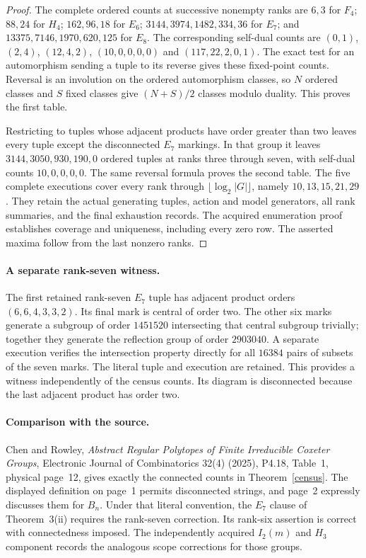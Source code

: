 \documentclass[11pt,a4paper]{article}
\begin{document}
\begin{proof}
The complete ordered counts at successive nonempty ranks are
$6,3$ for $F_4$; $88,24$ for $H_4$; $162,96,18$ for $E_6$;
$3144,3974,1482,334,36$ for $E_7$; and
$13375,7146,1970,620,125$ for $E_8$.
The corresponding self-dual counts are
$(0,1)$, $(2,4)$, $(12,4,2)$, $(10,0,0,0,0)$ and
$(117,22,2,0,1)$.
The exact test for an automorphism sending a tuple to its reverse
gives these fixed-point counts. Reversal is an involution on the
ordered automorphism classes, so $N$ ordered classes and $S$
fixed classes give $(N+S)/2$ classes modulo duality. This proves
the first table.

Restricting to tuples whose adjacent products have order greater
than two leaves every tuple except the disconnected $E_7$
markings. In that group it leaves $3144,3050,930,190,0$ ordered
tuples at ranks three through seven, with self-dual counts
$10,0,0,0,0$. The same reversal formula proves the second table.
The five complete executions cover every rank through
$\lfloor\log_2|G|\rfloor$, namely $10,13,15,21,29$.
They retain the actual generating tuples, action and model
generators, all rank summaries, and the final exhaustion records.
The acquired enumeration proof establishes coverage and
uniqueness, including every zero row. The asserted maxima follow
from the last nonzero ranks.
\end{proof}

\paragraph{A separate rank-seven witness.}
The first retained rank-seven $E_7$ tuple has adjacent product
orders $(6,6,4,3,3,2)$. Its final mark is central of order two.
The other six marks generate a subgroup of order $1451520$
intersecting that central subgroup trivially; together they
generate the reflection group of order $2903040$. A separate
execution verifies the intersection property directly for all
$16384$ pairs of subsets of the seven marks. The literal tuple
and execution are retained. This provides a witness independently
of the census counts. Its diagram is disconnected because the
last adjacent product has order two.

\paragraph{Comparison with the source.}
Chen and Rowley, \emph{Abstract Regular Polytopes of Finite
Irreducible Coxeter Groups}, Electronic Journal of Combinatorics
32(4) (2025), P4.18, Table~1, physical page~12, gives exactly
the connected counts in Theorem~\ref{census}. The displayed
definition on page~1 permits disconnected strings, and page~2
expressly discusses them for $B_n$. Under that literal convention,
the $E_7$ clause of Theorem~3(ii) requires the rank-seven
correction. Its rank-six assertion is correct with connectedness
imposed. The independently acquired $I_2(m)$ and $H_3$ component
records the analogous scope corrections for those groups.
\end{document}
